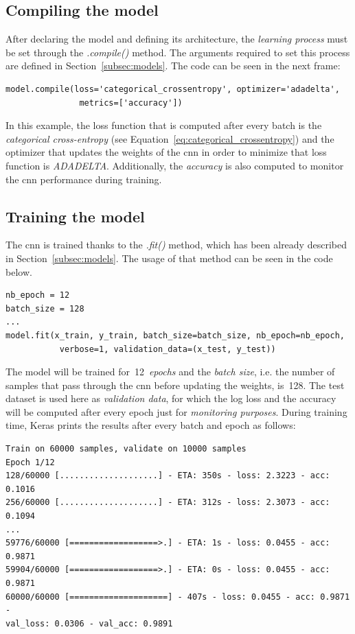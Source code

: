 \subsection{Compiling the model}
After declaring the model and defining its architecture, the \emph{learning process} must be set through the  \textit{.compile()} method. The arguments required to set this process are defined in Section~\ref{subsec:models}. The code can be seen in the next frame:
\begin{lstlisting}
model.compile(loss='categorical_crossentropy', optimizer='adadelta', 
               metrics=['accuracy'])
\end{lstlisting}

In this example, the loss function that is computed after every batch is the \emph{categorical cross-entropy} (see Equation~\ref{eq:categorical_crossentropy}) and the optimizer that updates the weights of the \gls{cnn} in order to minimize that loss function is \emph{ADADELTA}. Additionally, the \emph{accuracy} is also computed to monitor the \gls{cnn} performance during training.

\subsection{Training the model}
The \gls{cnn} is trained thanks to the \textit{.fit()} method, which has been already described in Section~\ref{subsec:models}. The usage of that method can be seen in the code below.
\begin{lstlisting}
nb_epoch = 12
batch_size = 128
...
model.fit(x_train, y_train, batch_size=batch_size, nb_epoch=nb_epoch,
           verbose=1, validation_data=(x_test, y_test))
\end{lstlisting}

The model will be trained for~12~\emph{epochs} and the \emph{batch size}, i.e. the number of samples that pass through the \gls{cnn} before updating the weights, is~128. The test dataset is used here as \emph{validation data}, for which the log loss and the accuracy will be computed after every epoch just for \emph{monitoring purposes}. During training time, Keras prints the results after every batch and epoch as follows:
\begin{Verbatim}[frame=single]
Train on 60000 samples, validate on 10000 samples
Epoch 1/12
128/60000 [....................] - ETA: 350s - loss: 2.3223 - acc: 0.1016
256/60000 [....................] - ETA: 312s - loss: 2.3073 - acc: 0.1094
...
59776/60000 [==================>.] - ETA: 1s - loss: 0.0455 - acc: 0.9871
59904/60000 [==================>.] - ETA: 0s - loss: 0.0455 - acc: 0.9871
60000/60000 [====================] - 407s - loss: 0.0455 - acc: 0.9871 - 
val_loss: 0.0306 - val_acc: 0.9891
\end{Verbatim}

